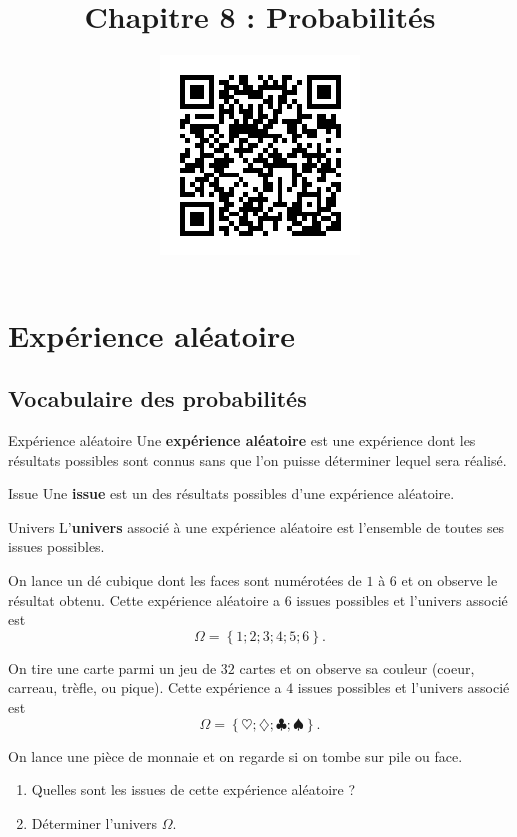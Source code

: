 \documentclass[11pt]{article}
\title{Chapitre 8 : Probabilités}
\date{\vspace{-14mm}
\href{https://erou.forge.aeif.fr/s11/probas.html}{
  \includegraphics[scale=.7]{qrcode.png}}
\vspace{-12mm}}
\author{}
\begin{document}
\maketitle\thispagestyle{fancy}

\section{Expérience aléatoire}
\subsection{Vocabulaire des probabilités}

\begin{defi}{Expérience aléatoire}
  Une \textbf{expérience aléatoire} est une expérience dont les résultats
  possibles sont connus sans que l'on puisse déterminer lequel sera réalisé.
\end{defi}

\begin{defi}{Issue}
  Une \textbf{issue} est un des résultats possibles d'une expérience aléatoire.
\end{defi}

\begin{defi}{Univers}
  L'\textbf{univers} associé à une expérience aléatoire est l'ensemble de toutes
  ses issues possibles.
\end{defi}

\begin{exemple}
  On lance un dé cubique dont les faces sont numérotées de $1$ à $6$ et on
  observe le résultat obtenu. Cette expérience aléatoire a $6$ issues possibles
  et l'univers associé est
  \[
    \Omega = \left\{ 1; 2; 3; 4; 5; 6 \right\}.
  \]
\end{exemple}

\begin{exemple}
  On tire une carte parmi un jeu de $32$ cartes et on observe sa couleur (coeur,
  carreau, trèfle, ou pique). Cette expérience a $4$ issues possibles et
  l'univers associé est
  \[
    \Omega = \left\{ \heartsuit; \diamondsuit; \clubsuit; \spadesuit \right\}.
  \]
\end{exemple}

\begin{app}
  On lance une pièce de monnaie et on regarde si on tombe sur pile ou face.
  \begin{enumerate}
    \item Quelles sont les issues de cette expérience aléatoire ?
    \item Déterminer l'univers $\Omega$.
  \end{enumerate}
\end{app}
\end{document}
